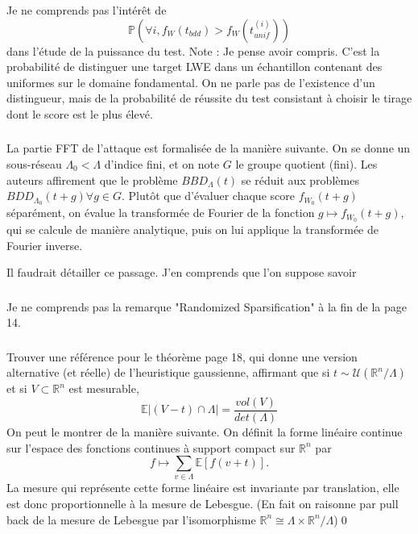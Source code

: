 \documentclass{article}
\begin{document}
 
\subsubsection{}

Je ne comprends pas l'intérêt de
$$\mathbb P( \forall i , f_W(t_{bdd}) > f_W(t^{(i)}_{unif}) )   $$
dans l'étude de la puissance du test. Note : Je pense avoir compris. C'est la probabilité de distinguer une target LWE dans un échantillon contenant des uniformes sur le domaine fondamental. On ne parle pas de l'existence d'un distingueur, mais de la probabilité de réussite du test consistant à choisir le tirage dont le score est le plus élevé.

\subsubsection{}

La partie FFT de l'attaque est formalisée de la manière suivante. On se donne un sous-réseau $\Lambda_0 < \Lambda $ d'indice fini, et on note $G$ le groupe quotient (fini). Les auteurs affirement que le problème $BBD_{\Lambda}(t)$ se réduit aux problèmes $BDD_{\Lambda_0}(t+g) \forall g \in G$. Plutôt que d'évaluer chaque score $f_{W_0}(t+g)$ séparément, on évalue la transformée de Fourier de la fonction $g \mapsto  f_{W_0}(t+g)$, qui se calcule de manière analytique, puis on lui applique la transformée de Fourier inverse.

Il faudrait détailler ce passage. J'en comprends que l'on suppose savoir 

\subsubsection{}
Je ne comprends pas la remarque "Randomized Sparsification" à la fin de la page 14.	

\subsubsection{}
Trouver une référence pour le théorème page 18, qui donne une version alternative (et réelle) de l'heuristique gaussienne, affirmant que si $t\sim \mathcal U(\mathbb R^n/\Lambda)$ et si $V\subset \mathbb R^n$ est mesurable, 
$$\mathbb E|(V -t)\cap \Lambda | = \frac{vol(V)}{det(\Lambda)}$$
On peut le montrer de la manière suivante. On définit la forme linéaire continue sur l'espace des fonctions continues à support compact sur $\mathbb R^n$ par 
$$f\mapsto \sum_{v\in \Lambda} \mathbb E[f(v+t )]. $$
La mesure qui représente cette forme linéaire est invariante par translation, elle est donc proportionnelle à la mesure de Lebesgue. (En fait on raisonne par pull back de la mesure de Lebesgue par l'isomorphisme $\mathbb R^n \cong \Lambda \times \mathbb R^n /\Lambda$)\qed 
\end{document}
